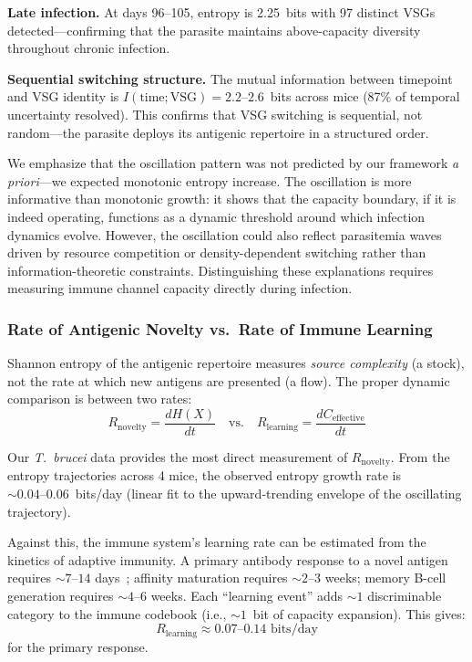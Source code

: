 \documentclass[twocolumn,10pt]{article}
\begin{document}
\textbf{Late infection.}  At days 96--105, entropy is 2.25~bits with 97 distinct VSGs detected---confirming that the parasite maintains above-capacity diversity throughout chronic infection.

\textbf{Sequential switching structure.}  The mutual information between timepoint and VSG identity is $I(\text{time}; \text{VSG}) = 2.2\text{--}2.6$~bits across mice (87\% of temporal uncertainty resolved).  This confirms that VSG switching is sequential, not random---the parasite deploys its antigenic repertoire in a structured order.

We emphasize that the oscillation pattern was not predicted by our framework \emph{a priori}---we expected monotonic entropy increase.  The oscillation is more informative than monotonic growth: it shows that the capacity boundary, if it is indeed operating, functions as a dynamic threshold around which infection dynamics evolve.  However, the oscillation could also reflect parasitemia waves driven by resource competition or density-dependent switching rather than information-theoretic constraints.  Distinguishing these explanations requires measuring immune channel capacity directly during infection.

\subsubsection{Rate of Antigenic Novelty vs.\ Rate of Immune Learning}
\label{sec:rates}

Shannon entropy of the antigenic repertoire measures \emph{source complexity} (a stock), not the rate at which new antigens are presented (a flow).  The proper dynamic comparison is between two rates:
\begin{equation}
R_{\text{novelty}} = \frac{dH(X)}{dt} \quad \text{vs.} \quad R_{\text{learning}} = \frac{dC_{\text{effective}}}{dt}
\label{eq:rates}
\end{equation}

Our \textit{T.~brucei} data provides the most direct measurement of $R_{\text{novelty}}$.  From the entropy trajectories across 4 mice, the observed entropy growth rate is ${\sim}0.04\text{--}0.06$~bits/day (linear fit to the upward-trending envelope of the oscillating trajectory).

Against this, the immune system's learning rate can be estimated from the kinetics of adaptive immunity.  A primary antibody response to a novel antigen requires ${\sim}7\text{--}14$ days~\citep{janeway2001}; affinity maturation requires ${\sim}2\text{--}3$ weeks; memory B-cell generation requires ${\sim}4\text{--}6$ weeks.  Each ``learning event'' adds ${\sim}1$ discriminable category to the immune codebook (i.e., ${\sim}1$~bit of capacity expansion).  This gives:
\begin{equation}
R_{\text{learning}} \approx 0.07\text{--}0.14 \text{~bits/day}
\end{equation}
for the primary response.
\end{document}
